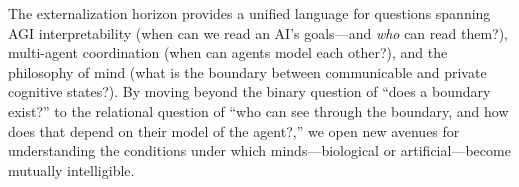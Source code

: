 \documentclass[runningheads]{llncs}
\begin{document}
The externalization horizon provides a unified language for questions spanning AGI interpretability (when can we read an AI's goals---and \emph{who} can read them?), multi-agent coordination (when can agents model each other?), and the philosophy of mind (what is the boundary between communicable and private cognitive states?). By moving beyond the binary question of ``does a boundary exist?'' to the relational question of ``who can see through the boundary, and how does that depend on their model of the agent?,'' we open new avenues for understanding the conditions under which minds---biological or artificial---become mutually intelligible.

\end{document}
